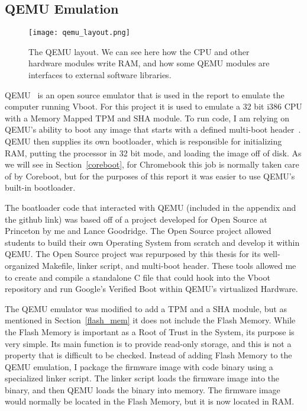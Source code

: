 \documentclass[../report.tex]{subfiles}
\begin{document}
\subsection{QEMU Emulation}\label{qemu_em}

\begin{figure}
  \centering
  \texttt{[image: qemu\_layout.png]}
  \caption{The QEMU layout. We can see here how the CPU and other hardware modules write RAM, and how some QEMU modules are interfaces to external software libraries.}
  \label{fig:qemu_layout}
\end{figure}

QEMU~\cite{qemu-site} is an open source emulator that is used in the report to emulate the computer running Vboot.
For this project it is used to emulate a 32 bit i386 CPU with a Memory Mapped TPM and SHA module.
To run code, I am relying on QEMU's ability to boot any image that starts with a defined multi-boot header~\cite{multiboot}.
QEMU then supplies its own bootloader, which is responsible for initializing RAM, putting the processor in 32 bit mode, and loading the image off of disk.
As we will see in Section~\ref{coreboot}, for Chromebook this job is normally taken care of by Coreboot, but for the purposes of this report it was easier to use QEMU's built-in bootloader.

The boatloader code that interacted with QEMU (included in the appendix and the github link) was based off of a project developed for Open Source at Princeton by me and Lance Goodridge.
The Open Source project allowed students to build their own Operating System from scratch and develop it within QEMU\@.
The Open Source project was repurposed by this thesis for its well-organized Makefile, linker script, and multi-boot header.
These tools allowed me to create and compile a standalone C file that could hook into the Vboot repository and run Google's Verified Boot within QEMU's virtualized Hardware.

The QEMU emulator was modified to add a TPM and a SHA module, but as mentioned in Section~\ref{flash_mem} it does not include the Flash Memory.
While the Flash Memory is important as a Root of Trust in the System, its purpose is very simple.
Its main function is to provide read-only storage, and this is not a property that is difficult to be checked.
Instead of adding Flash Memory to the QEMU emulation, I package the firmware
image with code binary using a specialized linker script. %
The linker script loads the firmware image into the binary, and then QEMU loads
the binary into memory.
The firmware image would normally be located in the Flash Memory, but it is now
located in RAM.
\end{document}
